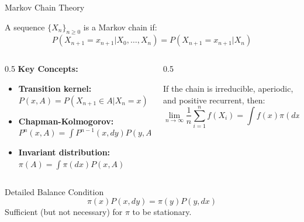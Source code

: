 \documentclass[aspectratio=169,11pt]{beamer}
\begin{document}
\begin{frame}{Markov Chain Theory}
\begin{definition}
A sequence $\{X_n\}_{n \geq 0}$ is a Markov chain if:
\[P(X_{n+1} = x_{n+1} | X_0, \ldots, X_n) = P(X_{n+1} = x_{n+1} | X_n)\]
\end{definition}

\begin{columns}
\begin{column}{0.5\textwidth}
\textbf{Key Concepts:}
\begin{itemize}
\item \textbf{Transition kernel:} $P(x, A) = P(X_{n+1} \in A | X_n = x)$
\item \textbf{Chapman-Kolmogorov:} $P^n(x,A) = \int P^{n-1}(x,dy) P(y,A)$
\item \textbf{Invariant distribution:} $\pi(A) = \int \pi(dx) P(x,A)$
\end{itemize}
\end{column}
\begin{column}{0.5\textwidth}
\begin{theorem}
If the chain is irreducible, aperiodic, and positive recurrent, then:
\[\lim_{n \to \infty} \frac{1}{n} \sum_{i=1}^n f(X_i) = \int f(x) \pi(dx) \quad \text{a.s.}\]
\end{theorem}
\end{column}
\end{columns}

\vspace{0.3cm}
\begin{block}{Detailed Balance Condition}
\[\pi(x) P(x, dy) = \pi(y) P(y, dx)\]
Sufficient (but not necessary) for $\pi$ to be stationary.
\end{block}
\end{frame}
\end{document}
